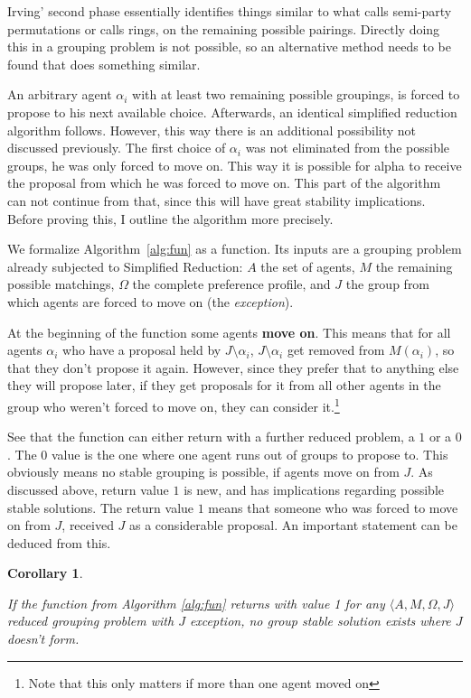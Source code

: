 \documentclass{elsarticle}
\newtheorem{mysta}{Corollary}
\begin{document}
Irving' second phase essentially identifies things similar to what \cite{tan91} calls semi-party permutations or \cite{chung00} calls rings, on the remaining possible pairings. Directly doing this in a grouping problem is not possible, so an alternative method needs to be found that does something similar.

An arbitrary agent $\alpha_i$ with at least two remaining possible groupings, is forced to propose to his next available choice. Afterwards, an identical simplified reduction algorithm follows. However, this way there is an additional possibility not discussed previously. The first choice of $\alpha_i$ was not eliminated from the possible groups, he was only forced to move on. This way it is possible for alpha to receive the proposal from which he was forced to move on. This part of the algorithm can not continue from that, since this will have great stability implications. Before proving this, I outline the algorithm more precisely.

We formalize Algorithm~\ref{alg:fun} as a function. Its inputs are a grouping problem already subjected to Simplified Reduction: $A$ the set of agents, $M$ the remaining possible matchings, $\Omega$ the complete preference profile, and $J$ the group from which agents are forced to move on (the \emph{exception}).

At the beginning of the function some agents \textbf{move on}. This means that for all agents $\alpha_i$ who have a proposal held by $J \setminus \alpha_i$,  $J \setminus \alpha_i$ get removed from $M(\alpha_i)$, so that they don't propose it again. However, since they prefer that to anything else they will propose later, if they get proposals for it from all other agents in the group who weren't forced to move on, they can consider it.\footnote{Note that this only matters if more than one agent moved on}

\AlgProcessing

See that the function can either return with a further reduced problem, a $1$ or a $0$. The $0$ value is the one where one agent runs out of groups to propose to. This obviously means no stable grouping is possible, if agents move on from $J$. As discussed above, return value $1$ is new, and has implications regarding possible stable solutions. The return value $1$ means that someone who was forced to move on from $J$, received $J$ as a considerable proposal. An important statement can be deduced from this.

\begin{mysta}
\label{sta:ret1}

If the function from Algorithm \ref{alg:fun} returns with value 1 for any $\langle A,M,\Omega,J \rangle$ reduced grouping problem with $J$ exception, no group stable solution exists where $J$ doesn't form.

\end{mysta}
\end{document}
